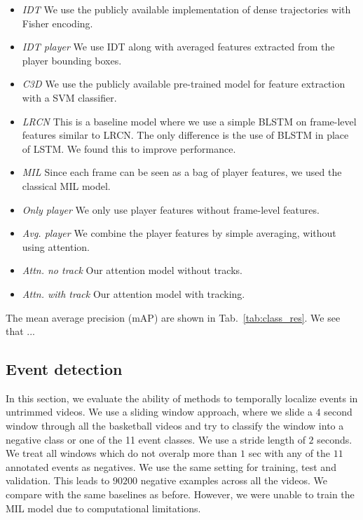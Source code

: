 \begin{itemize}
  \item \emph{IDT\cite{Wang_CVPR11}} We use the publicly available implementation of dense trajectories with
  Fisher encoding.
  
  \item \emph{IDT\cite{Wang_CVPR11} player} We use IDT along with averaged features extracted from the player
  bounding boxes.

  \item \emph{C3D \cite{Tran_arxiv14}} We use the publicly available pre-trained model for feature extraction
  with a SVM classifier.

  \item \emph{LRCN \cite{Donahue_arxiv14}} This is a baseline model where we use a simple BLSTM on frame-level features similar
  to LRCN. The only difference is the use of BLSTM in place of LSTM. We found this to improve
  performance.

  \item \emph{MIL \cite{}} Since each frame can be seen as a bag of player features, we used the
  classical MIL model. 

  \item \emph{Only player} We only use player features without frame-level
  features.
 
  \item \emph{Avg. player} We combine the player features by simple averaging, without
using  attention.

  \item \emph{Attn. no track} Our attention model without tracks.

  \item \emph{Attn. with track} Our attention model with tracking.
\end{itemize}

The mean average precision (mAP)
are shown in Tab.~\ref{tab:class_res}. We see that ...


\subsection{Event detection}

In this section, we evaluate the ability of methods to temporally localize events in untrimmed videos.
We use a sliding window approach, where we slide a $4$ second window
through all the basketball videos and try to classify the window into a negative
class or one of the 11 event classes. We use a stride length of $2$ seconds.
We treat all windows which do not overalp more than $1$ sec with any of the $11$ annotated
events as negatives. We use the same setting for training, test and validation.
This leads to $90200$ negative examples across all the videos.
 We compare with the same baselines as before. However, we were unable
 to train the MIL model due to computational limitations.

